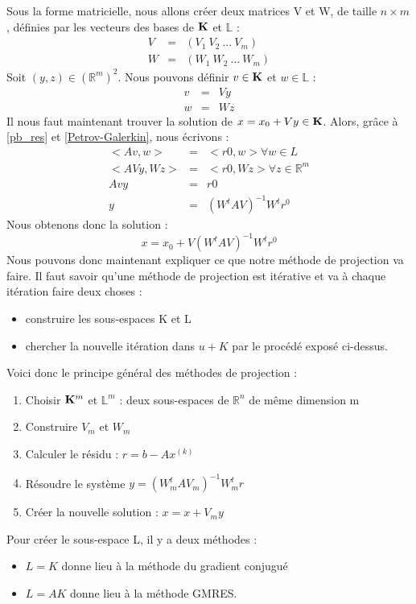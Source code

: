 Sous la forme matricielle, nous allons créer deux matrices V et W, de taille $n \times m$,  définies par les vecteurs des bases de $\mathbf{K}$ et $\mathbb{L}$ : 
\begin{eqnarray}
V &=& (V_1 \ V_2 \ ... \ V_m ) \\
W &=& (W_1 \ W_2 \ ... \ W_m )
\end{eqnarray}
Soit $(y, z) \in (\mathbb{R}^m)^2$. Nous pouvons définir $v \in \mathbf{K}$ et $w \in \mathbb{L}$ :
\begin{eqnarray}
v &=& Vy\\
w &=& Wz
\end{eqnarray}
Il nous faut maintenant trouver la solution de $ x = x_0 + Vy \in \mathbf{K}$. Alors, grâce à \ref{pb_res} et \ref{Petrov-Galerkin}, nous écrivons : 
\begin{eqnarray}
<Av, w> &=& <r0, w> \forall w \in L\\
<AVy, Wz> &=& <r0, Wz> \forall z \in \mathbb{R}^m \\
Avy &=& r0 \\
y &=& (W^t A V)^{-1} W^tr^0
\end{eqnarray}
Nous obtenons donc la solution : 
\begin{equation}
x = x_0 + V (W^t A V)^{-1} W^tr^0
\end{equation}
Nous pouvons donc maintenant expliquer ce que notre méthode de projection va faire. Il faut savoir qu'une méthode de projection est itérative et va à chaque itération faire deux choses  :
\begin{itemize}
	\item construire les sous-espaces K et L
	\item chercher la nouvelle itération dans $u + K$ par le procédé exposé ci-dessus.
\end{itemize}
Voici donc le principe général des méthodes de projection : 
\begin{enumerate}
	\item Choisir $\mathbf{K}^m$ et $\mathbb{L}^m$ : deux sous-espaces de $\mathbb{R}^n$ de même dimension m
	\item Construire $V_m$ et $W_m$
	\item Calculer le résidu : $r = b - Ax^{(k)}$
	\item Résoudre le système $y = (W^t_m A V_m)^{-1} W^t_mr$
	\item Créer la nouvelle solution : $x = x + V_m y$
\end{enumerate}
Pour créer le sous-espace L, il y a deux méthodes : 
\begin{itemize}
	\item $L = K$ donne lieu à la méthode du gradient conjugué
	\item $L = AK$ donne lieu à la méthode GMRES.
\end{itemize}
